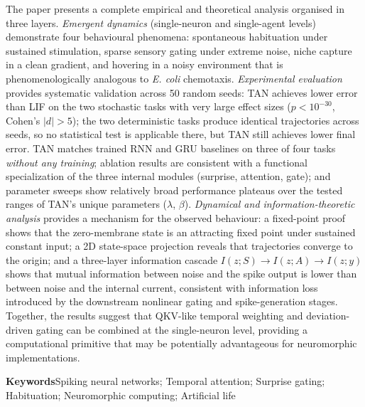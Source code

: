 \begin{center}
\begin{minipage}{0.92\textwidth}
The paper presents a complete empirical and theoretical analysis organised in three layers. \textit{Emergent dynamics} (single-neuron and single-agent levels) demonstrate four behavioural phenomena: spontaneous habituation under sustained stimulation, sparse sensory gating under extreme noise, niche capture in a clean gradient, and hovering in a noisy environment that is phenomenologically analogous to \textit{E. coli} chemotaxis. \textit{Experimental evaluation} provides systematic validation across 50 random seeds: TAN achieves lower error than LIF on the two stochastic tasks with very large effect sizes ($p<10^{-30}$, Cohen's $|d|>5$); the two deterministic tasks produce identical trajectories across seeds, so no statistical test is applicable there, but TAN still achieves lower final error. TAN matches trained RNN and GRU baselines on three of four tasks \textit{without any training}; ablation results are consistent with a functional specialization of the three internal modules (surprise, attention, gate); and parameter sweeps show relatively broad performance plateaus over the tested ranges of TAN's unique parameters ($\lambda$, $\beta$). \textit{Dynamical and information-theoretic analysis} provides a mechanism for the observed behaviour: a fixed-point proof shows that the zero-membrane state is an attracting fixed point under sustained constant input; a 2D state-space projection reveals that trajectories converge to the origin; and a three-layer information cascade $I(z; S) \to I(z; A) \to I(z; y)$ shows that mutual information between noise and the spike output is lower than between noise and the internal current, consistent with information loss introduced by the downstream nonlinear gating and spike-generation stages. Together, the results suggest that QKV-like temporal weighting and deviation-driven gating can be combined at the single-neuron level, providing a computational primitive that may be potentially advantageous for neuromorphic implementations.

\vspace{0.6em}
\noindent\textbf{Keywords}\quad Spiking neural networks; Temporal attention; Surprise gating; Habituation; Neuromorphic computing; Artificial life
\end{minipage}
\end{center}
